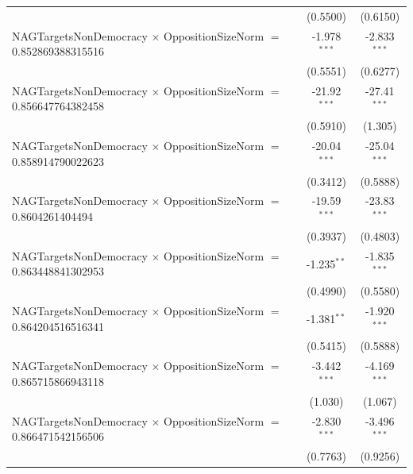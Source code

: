 \begin{tabular}{lcc}
                                                                                & (0.5500)             & (0.6150)\\   
   NAGTargetsNonDemocracy $\times$ OppositionSizeNorm $=$ 0.852869388315516     & -1.978$^{***}$       & -2.833$^{***}$\\   
                                                                                & (0.5551)             & (0.6277)\\   
   NAGTargetsNonDemocracy $\times$ OppositionSizeNorm $=$ 0.856647764382458     & -21.92$^{***}$       & -27.41$^{***}$\\   
                                                                                & (0.5910)             & (1.305)\\   
   NAGTargetsNonDemocracy $\times$ OppositionSizeNorm $=$ 0.858914790022623     & -20.04$^{***}$       & -25.04$^{***}$\\   
                                                                                & (0.3412)             & (0.5888)\\   
   NAGTargetsNonDemocracy $\times$ OppositionSizeNorm $=$ 0.8604261404494       & -19.59$^{***}$       & -23.83$^{***}$\\   
                                                                                & (0.3937)             & (0.4803)\\   
   NAGTargetsNonDemocracy $\times$ OppositionSizeNorm $=$ 0.863448841302953     & -1.235$^{**}$        & -1.835$^{***}$\\   
                                                                                & (0.4990)             & (0.5580)\\   
   NAGTargetsNonDemocracy $\times$ OppositionSizeNorm $=$ 0.864204516516341     & -1.381$^{**}$        & -1.920$^{***}$\\   
                                                                                & (0.5415)             & (0.5888)\\   
   NAGTargetsNonDemocracy $\times$ OppositionSizeNorm $=$ 0.865715866943118     & -3.442$^{***}$       & -4.169$^{***}$\\   
                                                                                & (1.030)              & (1.067)\\   
   NAGTargetsNonDemocracy $\times$ OppositionSizeNorm $=$ 0.866471542156506     & -2.830$^{***}$       & -3.496$^{***}$\\   
                                                                                & (0.7763)             & (0.9256)\\   

\end{tabular}
